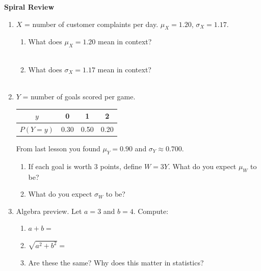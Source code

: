\documentclass[10pt]{article}
\begin{document}
\namedateperiod

\vspace{0.2in}

{\large\bfseries\color{navy} Spiral Review}

\vspace{0.12in}

\begin{enumerate}

    \item $X$ = number of customer complaints per day. $\mu_X = 1.20$, $\sigma_X = 1.17$.
    \begin{enumerate}[label=(\alph*), itemsep=8pt]
        \item What does $\mu_X = 1.20$ mean in context?\\
              \writeline\\[1pt]\writeline

        \item What does $\sigma_X = 1.17$ mean in context?\\
              \writeline\\[1pt]\writeline
    \end{enumerate}

    \vspace{0.14in}

    \item $Y$ = number of goals scored per game.
    \begin{center}
    \renewcommand{\arraystretch}{1.4}
    \begin{tabular}{@{}cccc@{}}
    $y$ & 0 & 1 & 2 \\
    \hline
    $P(Y=y)$ & 0.30 & 0.50 & 0.20 \\
    \end{tabular}
    \end{center}
    From last lesson you found $\mu_Y = 0.90$ and $\sigma_Y \approx 0.700$.
    \begin{enumerate}[label=(\alph*), itemsep=8pt]
        \item If each goal is worth 3 points, define $W = 3Y$. What do you expect
              $\mu_W$ to be? \quad \blank{3cm}
        \item What do you expect $\sigma_W$ to be? \quad \blank{3cm}
    \end{enumerate}

    \vspace{0.14in}

    \item Algebra preview. Let $a = 3$ and $b = 4$. Compute:
    \begin{enumerate}[label=(\alph*), itemsep=6pt]
        \item $a + b = $ \blank{2cm}
        \item $\sqrt{a^2 + b^2} = $ \blank{3cm}
        \item Are these the same? \blank{2cm} \quad Why does this matter in statistics?\\
              \writeline
    \end{enumerate}

\end{enumerate}
\end{document}
